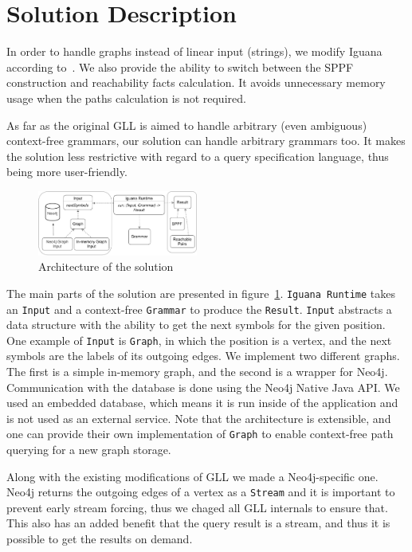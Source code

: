\section{Solution Description}

In order to handle graphs instead of linear input (strings), we modify Iguana according to~\cite{Grigorev:2017:CPQ:3166094.3166104}. We also provide the ability to switch between the SPPF construction and reachability facts calculation. It avoids unnecessary memory usage when the paths calculation is not required.

As far as the original GLL is aimed to handle arbitrary (even ambiguous) context-free grammars, our solution can handle arbitrary grammars too. It makes the solution less restrictive with regard to a query specification language, thus being more user-friendly.

\begin{figure}[ht]
    \centering
    \includegraphics[width=0.47\textwidth]{architecture.pdf}
    \caption{Architecture of the solution}
    \label{fig:solution_architecture}
\end{figure}

The main parts of the solution are presented in figure~\ref{fig:solution_architecture}. \texttt{Iguana Runtime} takes an \texttt{Input} and a context-free \texttt{Grammar} to produce the \texttt{Result}. \texttt{Input} abstracts a data structure with the ability to get the next symbols for the given position. One example of \texttt{Input} is \texttt{Graph}, in which the position is a vertex, and the next symbols are the labels of its outgoing edges. We implement two different graphs. The first is a simple in-memory graph, and the second is a wrapper for Neo4j. Communication with the database is done using the Neo4j Native Java API. We used an embedded database, which means it is run inside of the application and is not used as an external service. Note that the architecture is extensible, and one can provide their own implementation of \texttt{Graph} to enable context-free path querying for a new graph storage.

Along with the existing modifications of GLL we made a Neo4j-specific one. Neo4j returns the outgoing edges of a vertex as a \texttt{Stream} and it is important to prevent early stream forcing, thus we chaged all GLL internals to ensure that. This also has an added benefit that the query result is a stream, and thus it is possible to get the results on demand. 

